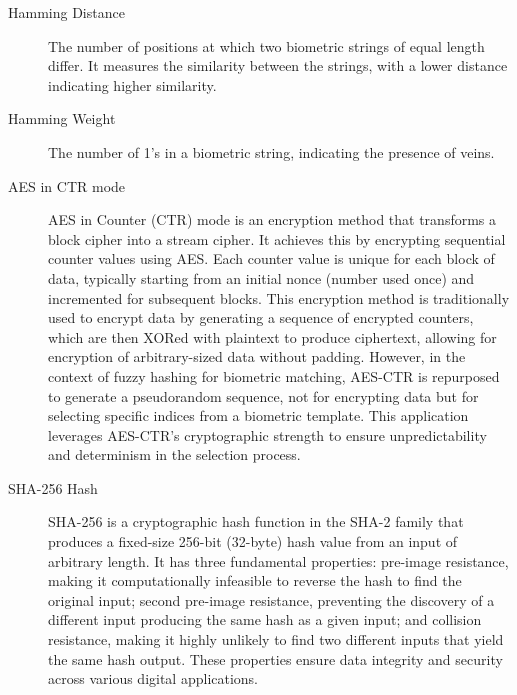 \begin{description}
    \item[Hamming Distance] \label{def:Hamming Distance} The number of positions at which two biometric strings of equal length differ. It measures the similarity between the strings, with a lower distance indicating higher similarity.

    \item[Hamming Weight] \label{def:Hamming Weight} The number of 1's in a biometric string, indicating the presence of veins.

    \item[AES in CTR mode] \label{def:AES CTR mode} AES in Counter (CTR) mode is an encryption method that transforms a block cipher into a stream cipher. It achieves this by encrypting sequential counter values using AES. Each counter value is unique for each block of data, typically starting from an initial nonce (number used once) and incremented for subsequent blocks. This encryption method is traditionally used to encrypt data by generating a sequence of encrypted counters, which are then XORed with plaintext to produce ciphertext, allowing for encryption of arbitrary-sized data without padding. However, in the context of fuzzy hashing for biometric matching, AES-CTR is repurposed to generate a pseudorandom sequence, not for encrypting data but for selecting specific indices from a biometric template. This application leverages AES-CTR's cryptographic strength to ensure unpredictability and determinism in the selection process.

    \item[SHA-256 Hash] \label{def:SHA-256} SHA-256 is a cryptographic hash function in the SHA-2 family that produces a fixed-size 256-bit (32-byte) hash value from an input of arbitrary length. It has three fundamental properties: pre-image resistance, making it computationally infeasible to reverse the hash to find the original input; second pre-image resistance, preventing the discovery of a different input producing the same hash as a given input; and collision resistance, making it highly unlikely to find two different inputs that yield the same hash output. These properties ensure data integrity and security across various digital applications.

\end{description}
